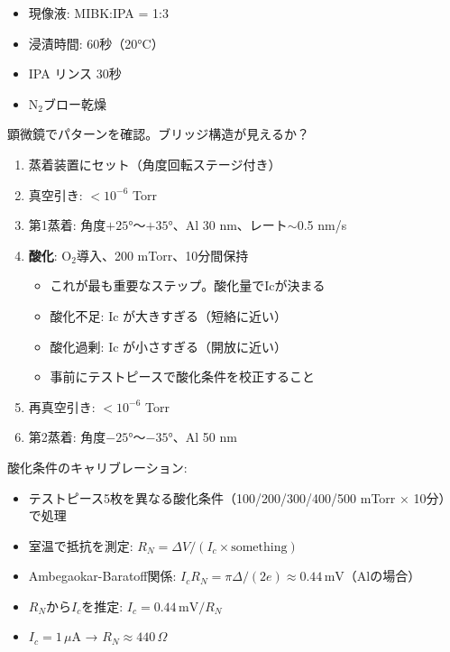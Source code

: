 \documentclass[12pt,a4paper]{article}
\begin{document}
\begin{practicebox}[Step 4: 現像]
\begin{itemize}
\item 現像液: MIBK:IPA = 1:3
\item 浸漬時間: 60秒（20°C）
\item IPA リンス 30秒
\item N$_2$ブロー乾燥
\end{itemize}

顕微鏡でパターンを確認。ブリッジ構造が見えるか？
\end{practicebox}

\begin{practicebox}[Step 5: 蒸着]
\begin{enumerate}
\item 蒸着装置にセット（角度回転ステージ付き）
\item 真空引き: $< 10^{-6}$ Torr
\item 第1蒸着: 角度$+25$°〜$+35$°、Al 30 nm、レート$\sim$0.5 nm/s
\item \textbf{酸化}: O$_2$導入、200 mTorr、10分間保持
  \begin{itemize}
  \item これが最も重要なステップ。酸化量でIcが決まる
  \item 酸化不足: Ic が大きすぎる（短絡に近い）
  \item 酸化過剰: Ic が小さすぎる（開放に近い）
  \item 事前にテストピースで酸化条件を校正すること
  \end{itemize}
\item 再真空引き: $< 10^{-6}$ Torr
\item 第2蒸着: 角度$-25$°〜$-35$°、Al 50 nm
\end{enumerate}
\end{practicebox}

\begin{warnbox}
酸化条件のキャリブレーション:
\begin{itemize}
\item テストピース5枚を異なる酸化条件（100/200/300/400/500 mTorr × 10分）で処理
\item 室温で抵抗を測定: $R_N = \Delta V / (I_c \times \mathrm{something})$
\item Ambegaokar-Baratoff関係: $I_c R_N = \pi\Delta/(2e) \approx 0.44\,\mathrm{mV}$（Alの場合）
\item $R_N$から$I_c$を推定: $I_c = 0.44\,\mathrm{mV} / R_N$
\item $I_c = 1\,\mu$A → $R_N \approx 440\,\Omega$
\end{itemize}
\end{warnbox}
\end{document}

